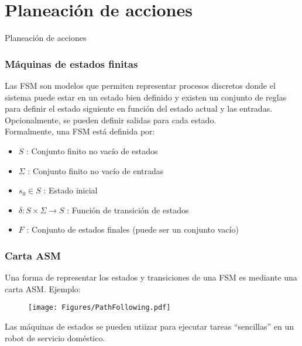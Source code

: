 \section{Planeación de acciones}

\begin{frame}
  \Huge
  Planeación de acciones
\end{frame}

\begin{frame}\frametitle{Máquinas de estados finitas}
  Las FSM son modelos que permiten representar procesos discretos donde el sistema puede estar en un estado bien definido y existen un conjunto de reglas para definir el estado siguiente en función del estado actual y las entradas. Opcionalmente, se pueden definir salidas para cada estado. \\
  Formalmente, una FSM está definida por:
  \begin{itemize}
  \item $S$ : Conjunto finito no vacío de estados
  \item $\Sigma$ : Conjunto finito no vacío de entradas
  \item $s_0 \in S$ : Estado inicial
  \item $\delta : S\times\Sigma\rightarrow S$ : Función de transición de estados
  \item $F$ : Conjunto de estados finales (puede ser un conjunto vacío)
  \end{itemize}
\end{frame}

\begin{frame}\frametitle{Carta ASM}
  Una forma de representar los estados y transiciones de una FSM es mediante una carta ASM. Ejemplo:
  \begin{figure}
    \centering
    \texttt{[image: Figures/PathFollowing.pdf]}
  \end{figure}
  Las máquinas de estados se pueden utiizar para ejecutar tareas ``sencillas'' en un robot de servicio doméstico. 
\end{frame}

